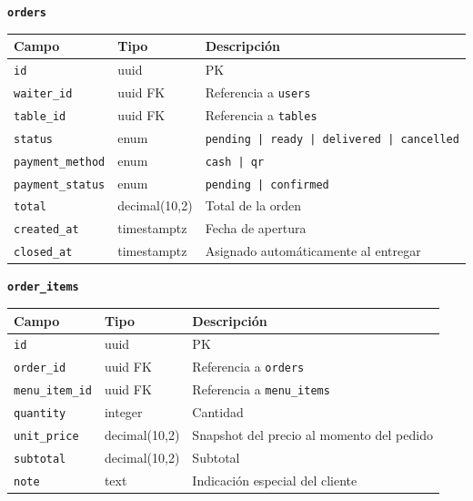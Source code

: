 \vspace{6pt}
\noindent\textbf{\texttt{orders}}

\begin{tabular}{lll}
  \toprule
  \textbf{Campo} & \textbf{Tipo} & \textbf{Descripción} \\
  \midrule
  \texttt{id}             & uuid          & PK \\
  \texttt{waiter\_id}     & uuid FK       & Referencia a \texttt{users} \\
  \texttt{table\_id}      & uuid FK       & Referencia a \texttt{tables} \\
  \texttt{status}         & enum          & \texttt{pending | ready | delivered | cancelled} \\
  \texttt{payment\_method} & enum         & \texttt{cash | qr} \\
  \texttt{payment\_status} & enum         & \texttt{pending | confirmed} \\
  \texttt{total}          & decimal(10,2) & Total de la orden \\
  \texttt{created\_at}    & timestamptz   & Fecha de apertura \\
  \texttt{closed\_at}     & timestamptz   & Asignado automáticamente al entregar \\
  \bottomrule
\end{tabular}

\vspace{6pt}
\noindent\textbf{\texttt{order\_items}}

\begin{tabular}{lll}
  \toprule
  \textbf{Campo} & \textbf{Tipo} & \textbf{Descripción} \\
  \midrule
  \texttt{id}           & uuid          & PK \\
  \texttt{order\_id}    & uuid FK       & Referencia a \texttt{orders} \\
  \texttt{menu\_item\_id} & uuid FK     & Referencia a \texttt{menu\_items} \\
  \texttt{quantity}     & integer       & Cantidad \\
  \texttt{unit\_price}  & decimal(10,2) & Snapshot del precio al momento del pedido \\
  \texttt{subtotal}     & decimal(10,2) & Subtotal \\
  \texttt{note}         & text          & Indicación especial del cliente \\
  \bottomrule
\end{tabular}   

